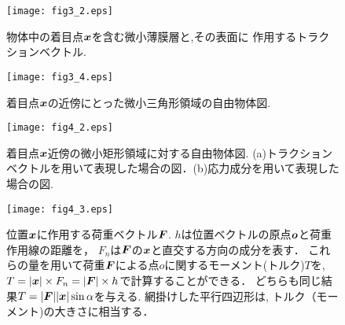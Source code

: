 \documentclass[10pt,a4j]{jarticle}
\begin{document}
\begin{figure}[h]
	\begin{center}
	\texttt{[image: fig3\_2.eps]} 
	\end{center}
	\caption{物体中の着目点$\mbox{\boldmath $x$}$を含む微小薄膜層と,その表面に
	作用するトラクションベクトル. } 
	\label{fig:fig3_2}
\end{figure}
\begin{figure}[h]
	\begin{center}
	\texttt{[image: fig3\_4.eps]} 
	\end{center}
	\caption{着目点$\mbox{\boldmath $x$}$の近傍にとった微小三角形領域の自由物体図.}
	\label{fig:fig3_4}
\end{figure}
\begin{figure}[h]
	\begin{center}
	\texttt{[image: fig4\_2.eps]} 
	\end{center}
	\caption{着目点$\mbox{\boldmath $x$}$近傍の微小矩形領域に対する自由物体図.
	(a)トラクションベクトルを用いて表現した場合の図．(b)応力成分を用いて表現した場合の図.} 
	\label{fig:fig4_1}
\end{figure}
\begin{figure}[h]
	\begin{center}
	\texttt{[image: fig4\_3.eps]} 
	\end{center}
	\caption{
	位置$\mbox{\boldmath $x$}$に作用する荷重ベクトル$\mbox{\boldmath $F$}$.
	$h$は位置ベクトルの原点$\mbox{\boldmath $o$}$と荷重作用線の距離を，
	$F_n$は$\mbox{\boldmath $F$}$の$\mbox{\boldmath $x$}$と直交する方向の成分を表す．
	これらの量を用いて荷重$\mbox{\boldmath $F$}$による点$o$に関するモーメント(トルク)$T$を,
	$T=|\mbox{\boldmath $x$}|\times F_n=|\mbox{\boldmath $F$}|\times h$で計算することができる．
	どちらも同じ結果$T=|\mbox{\boldmath $F$}| |\mbox{\boldmath $x$}|\sin\alpha$を与える.
	網掛けした平行四辺形は, トルク（モーメント)の大きさに相当する．
	 } 
	\label{fig:fig4_2}
\end{figure}
\end{document}
